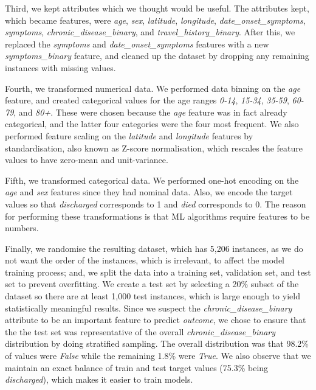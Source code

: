 \documentclass[twoside,11pt]{article}
\begin{document}
Third, we kept attributes which we thought would be useful. The attributes kept, which became features, were \emph{age}, \emph{sex}, \emph{latitude}, \emph{longitude}, \emph{date\_onset\_symptoms}, \emph{symptoms}, \emph{chronic\_disease\_binary}, and \emph{travel\_history\_binary}. After this, we replaced the \emph{symptoms} and \emph{date\_onset\_symptoms} features with a new \emph{symptoms\_binary} feature, and cleaned up the dataset by dropping any remaining instances with missing values. 

Fourth, we transformed numerical data. We performed data binning on the \emph{age} feature, and created categorical values for the age ranges \emph{0-14}, \emph{15-34}, \emph{35-59}, \emph{60-79}, and \emph{80+}. These were chosen because the \emph{age} feature was in fact already categorical, and the latter four categories were the four most frequent. We also performed feature scaling on the \emph{latitude} and \emph{longitude} features by standardisation, also known as Z-score normalisation, which rescales the feature values to have zero-mean and unit-variance.  

Fifth, we transformed categorical data. We performed one-hot encoding on the \emph{age} and \emph{sex} features since they had nominal data. Also, we encode the target values so that \emph{discharged} corresponds to 1 and \emph{died} corresponds to 0. The reason for performing these transformations is that ML algorithms require features to be numbers. 

Finally, we randomise the resulting dataset, which has 5,206 instances, as we do not want the order of the instances, which is irrelevant, to affect the model training process; and, we split the data into a training set, validation set, and test set to prevent overfitting. We create a test set by selecting a 20\% subset of the dataset so there are at least 1,000 test instances, which is large enough to yield statistically meaningful results. Since we suspect the \emph{chronic\_disease\_binary} attribute to be an important feature to predict \emph{outcome}, we chose to ensure that the the test set was representative of the overall \emph{chronic\_disease\_binary} distribution by doing stratified sampling. The overall distribution was that 98.2\% of values were \emph{False} while the remaining 1.8\% were \emph{True}. We also observe that we maintain an exact balance of train and test target values (75.3\% being \emph{discharged}), which makes it easier to train models.
\end{document}

